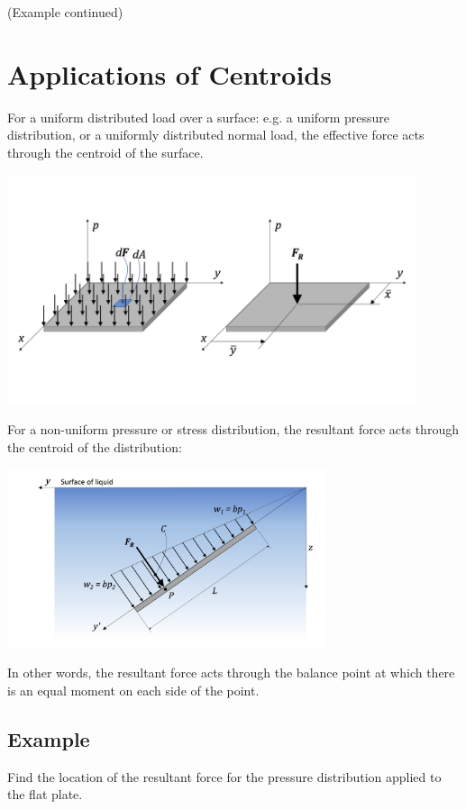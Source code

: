\documentclass[12pt,letterpaper,twoside]{report}
\begin{document}
(Example continued)

\newpage

\section{Applications of Centroids}
For a uniform distributed load over a surface:  e.g. a uniform pressure distribution, or a uniformly distributed normal load, the effective force acts through the centroid of the surface.  

\includegraphics[trim={0cm 2cm 0cm 2cm},clip,width=0.9\textwidth,center]{Slide37} 

For a non-uniform pressure or stress distribution, the resultant force acts through the centroid of the distribution:

\includegraphics[trim={2cm 1cm 1cm 1cm},clip,width=0.7\textwidth, left]{Slide38} 

\vspace*{8\baselineskip}

In other words, the resultant force acts through the balance point at which there is an equal moment on each side of the point.

\subsection{Example}
Find the location of the resultant force for the pressure distribution applied to the flat plate.  
\end{document}
